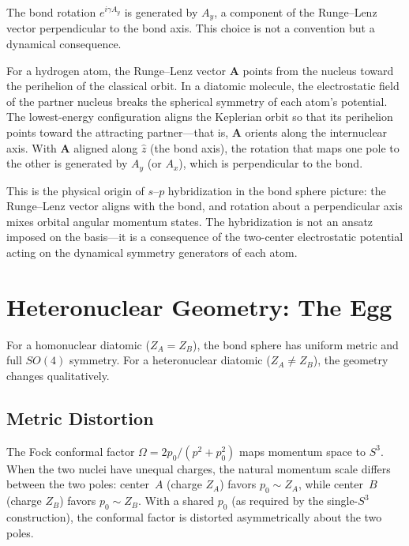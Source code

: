 \documentclass[aps,pra,twocolumn,superscriptaddress,longbibliography]{revtex4-2}
\theoremstyle{remark}
\theoremstyle{plain}
\begin{document}
The bond rotation $e^{i\gamma A_y}$ is generated by $A_y$, a component
of the Runge--Lenz vector perpendicular to the bond axis.  This choice
is not a convention but a dynamical consequence.

For a hydrogen atom, the Runge--Lenz vector $\mathbf{A}$ points from
the nucleus toward the perihelion of the classical orbit.  In a
diatomic molecule, the electrostatic field of the partner nucleus
breaks the spherical symmetry of each atom's potential.  The lowest-energy
configuration aligns the Keplerian orbit so that its perihelion points
toward the attracting partner---that is, $\mathbf{A}$ orients along
the internuclear axis.  With $\mathbf{A}$ aligned along $\hat{z}$ (the
bond axis), the rotation that maps one pole to the other is generated
by $A_y$ (or $A_x$), which is perpendicular to the bond.

This is the physical origin of $s$--$p$ hybridization in the bond sphere
picture: the Runge--Lenz vector aligns with the bond, and rotation about
a perpendicular axis mixes orbital angular momentum states.  The
hybridization is not an ansatz imposed on the basis---it is a consequence
of the two-center electrostatic potential acting on the dynamical
symmetry generators of each atom.


\section{Heteronuclear Geometry: The Egg}
\label{sec:heteronuclear}

For a homonuclear diatomic ($Z_A = Z_B$), the bond sphere has uniform
metric and full $SO(4)$ symmetry.  For a heteronuclear diatomic
($Z_A \neq Z_B$), the geometry changes qualitatively.

\subsection{Metric Distortion}

The Fock conformal factor $\Omega = 2p_0/(p^2 + p_0^2)$ maps
momentum space to $S^3$.  When the two nuclei have unequal charges,
the natural momentum scale differs between the two poles: center~$A$
(charge $Z_A$) favors $p_0 \sim Z_A$, while center~$B$ (charge $Z_B$)
favors $p_0 \sim Z_B$.  With a shared $p_0$ (as required by the
single-$S^3$ construction), the conformal factor is distorted
asymmetrically about the two poles.
\end{document}
